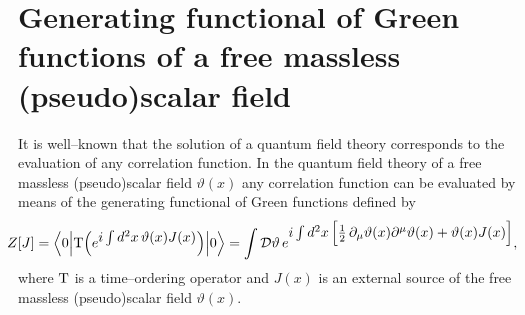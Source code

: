 \documentclass[a4paper,12pt] {article}
\begin{document}
\section{Generating functional of Green functions of a free
massless (pseudo)scalar field} 
\setcounter{equation}{0}

\hspace{0.2in} It is well--known that the solution of a quantum field
theory corresponds to the evaluation of any correlation function. In
the quantum field theory of a free massless (pseudo)scalar field
$\vartheta(x)$ any correlation function can be evaluated by means of
the generating functional of Green functions defined by
%
\begin{eqnarray}\label{label2.1}
\hspace{-0.15in}Z[J] = \Big\langle 0\Big|{\rm T}\Big(e^{\textstyle
i\int d^2x\,\vartheta(x)J(x)}\Big)\Big|0\Big\rangle = \int {\cal
D}\vartheta\,e^{\textstyle i\int
d^2x\,\Big[\frac{1}{2}\,\partial_{\mu}\vartheta(x)\partial^{\mu}
\vartheta(x) + \vartheta(x)J(x)\Big]},
\end{eqnarray}
%
where ${\rm T}$ is a time--ordering operator and $J(x)$ is an external
source of the free massless (pseudo)scalar field $\vartheta(x)$.
\end{document}
